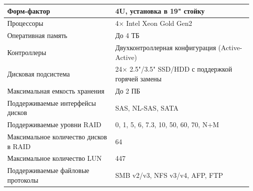 \documentclass[14pt, a4paper]{extarticle}
\begin{document}
\begin{tabularx}{\textwidth}{|l|X|}
  Форм-фактор                                     & 4U, установка в 19" стойку                                                                                                                                \\\hline
  Процессоры                                      & 4× Intel Xeon Gold Gen2                                                                                                                                   \\\hline
  Оперативная память                              & До 4 ТБ                                                                                                                                                   \\\hline
  Контроллеры                                     & Двухконтроллерная конфигурация (Active-Active)                                                                                                            \\\hline
  Дисковая подсистема                             & 24× 2.5"/3.5" SSD/HDD с поддержкой горячей замены                                                                                                         \\\hline
  Максимальная емкость хранения                   & До 2 ПБ                                                                                                                                                   \\\hline
  Поддерживаемые интерфейсы дисков                & SAS, NL-SAS, SATA                                                                                                                                         \\\hline
  Поддерживаемые уровни RAID                      & 0, 1, 5, 6, 7.3, 10, 50, 60, 70, N+M                                                                                                                      \\\hline
  Максимальное количество дисков в RAID           & 64                                                                                                                                                        \\\hline
  Максимальное количество LUN                     & 447                                                                                                                                                       \\\hline
  Поддерживаемые файловые протоколы               & SMB v2/v3, NFS v3/v4, AFP, FTP                                                                                                                            \\\hline

\end{tabularx}
\end{document}
